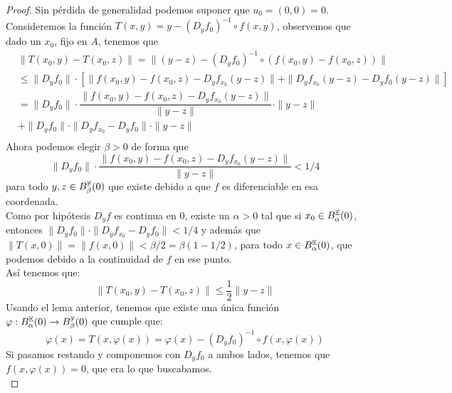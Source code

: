 \documentclass[12pt,a4paper]{book}
\begin{document}
\begin{teo}
\begin{proof}
Sin pérdida de generalidad podemos suponer que $u_0 = (0,0) = 0$.
Consideremos la función $T(x,y) = y - (D_yf_0)^{-1} \circ f(x,y)$, observemos que dado un $x_0$, fijo en $A$, tenemos que
\begin{align*}
&\| T(x_0,y) - T(x_0,z)\| = \| (y - z) - (D_yf_0)^{-1} \circ (f(x_0,y)-f(x_0,z)) \| \\
&\leq\|D_yf_0\| \cdot \left[ \| f(x_0, y ) - f(x_0,z) - D_yf_{x_0}(y-z) \| + \| D_yf_{x_0}(y-z) - D_yf_0(y-z) \| \right]\\
&= \|D_yf_0\| \cdot \dfrac{\| f(x_0, y ) - f(x_0,z) - D_yf_{x_0}(y-z) \|}{\| y-z \|} \cdot \| y-z \| \\
&+ \|D_yf_0\| \cdot \|D_yf_{x_0} - D_yf_0\| \cdot \| y-z\|\\
\end{align*}
Ahora podemos elegir $\beta>0$ de forma que 
$$\|D_yf_0\| \cdot \dfrac{\| f(x_0, y ) - f(x_0,z) - D_yf_{x_0}(y-z) \|}{\| y-z \|} < 1/4$$
para todo $y,z \in B_{\beta}^{\mathbb{F}}(0)$ que existe debido a que $f$ es diferenciable en esa coordenada.\\
Como por hipótesis $D_yf$ es continua en 0, existe un $\alpha > 0$ tal que si $x_0 \in B_{\alpha}^{\mathbb{E}}(0)$, entonces $\|D_yf_0\| \cdot\| D_yf_{x_0} - D_yf_0 \| < 1/4$ y además que $\| T(x,0) \| = \| f(x,0) \| < \beta/2 = \beta (1-1/2)$, para todo $x \in B_{\alpha}^{\mathbb{E}}(0)$, que podemos debido a la continuidad de $f$ en ese punto.\\
Así tenemos que:
$$ \|T(x_0,y)-T(x_0,z)\| \leq \frac{1}{2} \| y -z \|$$
Usando el lema anterior, tenemos que existe una única función $\varphi: B_{\alpha}^{\mathbb{E}}(0) \rightarrow B_{\beta}^{\mathbb{F}}(0)$ que cumple que:
$$ \varphi(x) = T(x, \varphi(x)) = \varphi(x) - (D_yf_0)^{-1} \circ f(x,\varphi(x))$$
Si pasamos restando y componemos con $D_yf_0$ a ambos lados, tenemos que $f(x,\varphi(x))=0$, que era lo que buscabamos.\\

\end{proof}
\end{teo}
\end{document}
